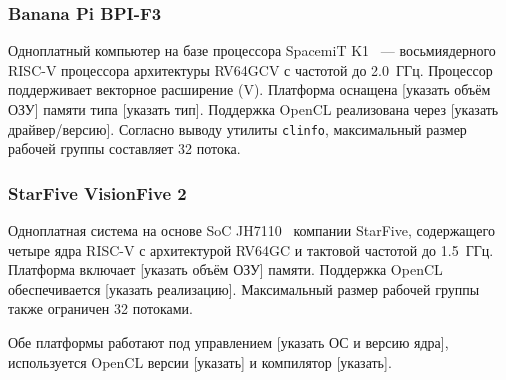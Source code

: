 \subsubsection{Banana Pi BPI-F3}

Одноплатный компьютер на базе процессора SpacemiT K1~\cite{spacemit2024} --- восьмиядерного RISC-V процессора архитектуры RV64GCV с частотой до 2.0~ГГц. Процессор поддерживает векторное расширение (V). Платформа оснащена [указать объём ОЗУ] памяти типа [указать тип]. Поддержка OpenCL реализована через [указать драйвер/версию]. Согласно выводу утилиты \texttt{clinfo}, максимальный размер рабочей группы составляет 32 потока.

\subsubsection{StarFive VisionFive 2}

Одноплатная система на основе SoC JH7110~\cite{starfive2023datasheet} компании StarFive, содержащего четыре ядра RISC-V с архитектурой RV64GC и тактовой частотой до 1.5~ГГц. Платформа включает [указать объём ОЗУ] памяти. Поддержка OpenCL обеспечивается [указать реализацию]. Максимальный размер рабочей группы также ограничен 32 потоками.

Обе платформы работают под управлением [указать ОС и версию ядра], используется OpenCL версии [указать] и компилятор [указать].